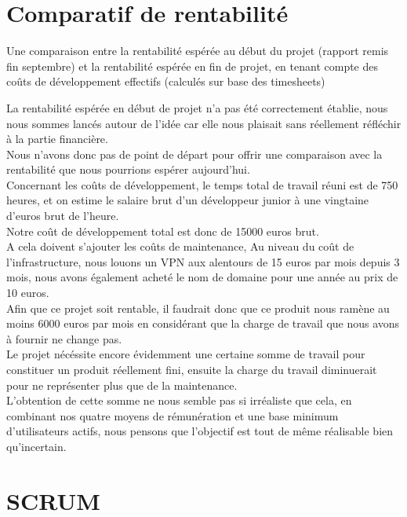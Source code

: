 \documentclass{report}
\begin{document}
\chapter{Comparatif de rentabilité} %

	Une comparaison entre la rentabilité espérée au début du projet (rapport remis fin septembre) et la rentabilité espérée en fin de projet, en tenant compte des coûts de développement effectifs (calculés sur base des timesheets)

	La rentabilité espérée en début de projet n'a pas été correctement établie, nous nous sommes lancés autour de l'idée car elle nous plaisait sans réellement réfléchir à la partie financière.\\
	Nous n'avons donc pas de point de départ pour offrir une comparaison avec la rentabilité que nous pourrions espérer aujourd'hui.\\

	Concernant les coûts de développement, le temps total de travail réuni est de 750 heures, et on estime le salaire brut d'un développeur junior à une vingtaine d'euros brut de l'heure.\\
	Notre coût de développement total est donc de 15000 euros brut.\\
	A cela doivent s'ajouter les coûts de maintenance, 
	Au niveau du coût de l'infrastructure, nous louons un VPN aux alentours de 15 euros par mois depuis 3 mois, nous avons également acheté le nom de domaine pour une année au prix de 10 euros.\\ 

	Afin que ce projet soit rentable, il faudrait donc que ce produit nous ramène au moins 6000 euros par mois en considérant que la charge de travail que nous avons à fournir ne change pas.\\
	Le projet nécéssite encore évidemment une certaine somme de travail pour constituer un produit réellement fini, ensuite la charge du travail diminuerait pour ne représenter plus que de la maintenance.\\
	
	L'obtention de cette somme ne nous semble pas si irréaliste que cela, en combinant nos quatre moyens de rémunération et une base minimum d'utilisateurs actifs, nous pensons que l'objectif est tout de même réalisable bien qu'incertain.\\

\chapter{SCRUM} %
\end{document}
